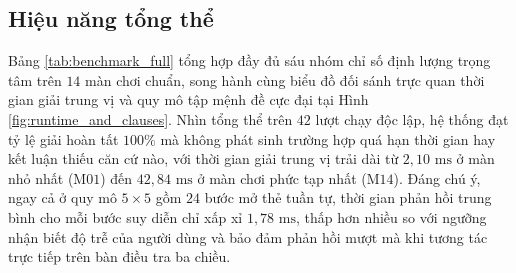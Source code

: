 \subsection{Hiệu năng tổng thể}
\label{subsec:exp_main_results}
Bảng \ref{tab:benchmark_full} tổng hợp đầy đủ sáu nhóm chỉ số định lượng trọng tâm
trên $14$ màn chơi chuẩn, song hành cùng biểu đồ đối sánh trực quan thời gian giải
trung vị và quy mô tập mệnh đề cực đại tại Hình \ref{fig:runtime_and_clauses}.
Nhìn tổng thể trên $42$ lượt chạy độc lập, hệ thống đạt tỷ lệ giải hoàn tất $100\%$
mà không phát sinh trường hợp quá hạn thời gian hay kết luận thiếu căn cứ nào, với
thời gian giải trung vị trải dài từ $2{,}10\text{ ms}$ ở màn nhỏ nhất
($\text{M01}$) đến $42{,}84\text{ ms}$ ở màn chơi phức tạp nhất ($\text{M14}$).
Đáng chú ý, ngay cả ở quy mô $5 \times 5$ gồm $24$ bước mở thẻ tuần tự, thời gian
phản hồi trung bình cho mỗi bước suy diễn chỉ xấp xỉ $1{,}78\text{ ms}$, thấp hơn
nhiều so với ngưỡng nhận biết độ trễ của người dùng và bảo đảm phản hồi mượt mà
khi tương tác trực tiếp trên bàn điều tra ba chiều.

